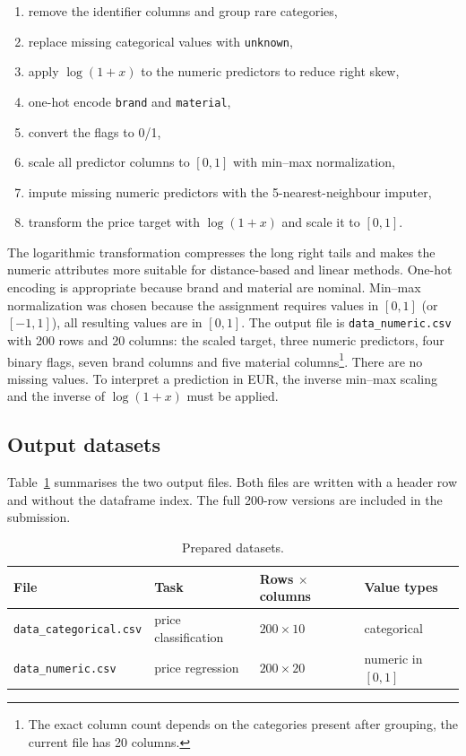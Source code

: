 \documentclass[11pt,a4paper]{article}
\begin{document}
\begin{enumerate}
  \item remove the identifier columns and group rare categories,
  \item replace missing categorical values with \texttt{unknown},
  \item apply \(\log(1+x)\) to the numeric predictors to reduce right skew,
  \item one-hot encode \texttt{brand} and \texttt{material},
  \item convert the flags to 0/1,
  \item scale all predictor columns to \([0,1]\) with min--max normalization,
  \item impute missing numeric predictors with the 5-nearest-neighbour imputer,
  \item transform the price target with \(\log(1+x)\) and scale it to \([0,1]\).
\end{enumerate}

The logarithmic transformation compresses the long right tails and makes the
numeric attributes more suitable for distance-based and linear methods.
One-hot encoding is appropriate because brand and material are nominal.
Min--max normalization was chosen because the assignment requires values in
\([0,1]\) (or \([-1,1]\)), all resulting values are in \([0,1]\). The output file
is \texttt{data\_numeric.csv} with 200 rows and 20 columns: the scaled target,
three numeric predictors, four binary flags, seven brand columns and five
material columns\footnote{The exact column count depends on the categories
present after grouping, the current file has 20 columns.}. There are no missing
values. To interpret a prediction in EUR, the inverse min--max scaling and the
inverse of \(\log(1+x)\) must be applied.

\subsection{Output datasets}

Table~\ref{tab:outputs} summarises the two output files. Both files are written
with a header row and without the dataframe index. The full 200-row versions are
included in the submission.

\begin{table}[H]
\centering
\small
\caption{Prepared datasets.}
\label{tab:outputs}
\begin{tabular}{llll}
\toprule
File & Task & Rows $\times$ columns & Value types \\
\midrule
\texttt{data\_categorical.csv} & price classification & \(200 \times 10\) & categorical \\
\texttt{data\_numeric.csv} & price regression & \(200 \times 20\) & numeric in \([0,1]\) \\
\bottomrule
\end{tabular}
\end{table}
\end{document}
